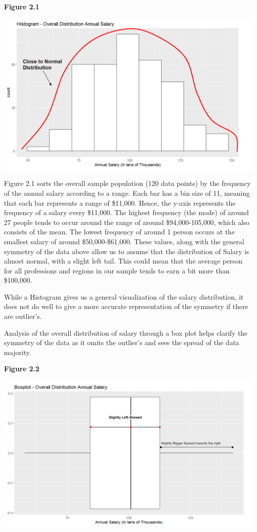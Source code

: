 \documentclass[
]{article}
\begin{document}
\textbf{Figure 2.1}

\includegraphics[width=7.29167in,height=\textheight]{Overall data Histogram.png}

Figure 2.1 sorts the overall sample population (120 data points) by the
frequency of the annual salary according to a range. Each bar has a bin
size of 11, meaning that each bar represents a range of \$11,000. Hence,
the y-axis represents the frequency of a salary every \$11,000. The
highest frequency (the mode) of around 27 people tends to occur around
the range of around \$94,000-105,000, which also consists of the mean.
The lowest frequency of around 1 person occurs at the smallest salary of
around \$50,000-\$61,000. These values, along with the general symmetry
of the data above allow us to assume that the distribution of Salary is
almost normal, with a slight left tail. This could mean that the average
person for all professions and regions in our sample tends to earn a bit
more than \$100,000.

While a Histogram gives us a general visualization of the salary
distribution, it does not do well to give a more accurate representation
of the symmetry if there are outlier's.

Analysis of the overall distribution of salary through a box plot helps
clarify the symmetry of the data as it omits the outlier's and sees the
spread of the data majority.

\textbf{Figure 2.2}

\includegraphics[width=7.29167in,height=\textheight]{Overall Data Boxplot.png}
\end{document}
